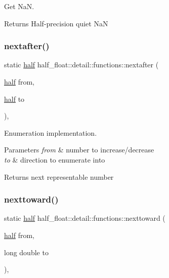 Get NaN. \begin{DoxyReturn}{Returns}
Half-\/precision quiet NaN 
\end{DoxyReturn}
\mbox{\label{structhalf__float_1_1detail_1_1functions_afad03c7ead9b0e39825852f274c72c5c}} 
\subsubsection{\texorpdfstring{nextafter()}{nextafter()}}
{\footnotesize\ttfamily static \hyperlink{classhalf__float_1_1half}{half} half\+\_\+float\+::detail\+::functions\+::nextafter (\begin{DoxyParamCaption}\item[{\hyperlink{classhalf__float_1_1half}{half}}]{from,  }\item[{\hyperlink{classhalf__float_1_1half}{half}}]{to }\end{DoxyParamCaption})\hspace{0.3cm}{\ttfamily [inline]}, {\ttfamily [static]}}

Enumeration implementation. 
\begin{DoxyParams}{Parameters}
{\em from} & number to increase/decrease \\
\hline
{\em to} & direction to enumerate into \\
\hline
\end{DoxyParams}
\begin{DoxyReturn}{Returns}
next representable number 
\end{DoxyReturn}
\mbox{\label{structhalf__float_1_1detail_1_1functions_a5d2061cb44af36a55953d764442236de}} 
\subsubsection{\texorpdfstring{nexttoward()}{nexttoward()}}
{\footnotesize\ttfamily static \hyperlink{classhalf__float_1_1half}{half} half\+\_\+float\+::detail\+::functions\+::nexttoward (\begin{DoxyParamCaption}\item[{\hyperlink{classhalf__float_1_1half}{half}}]{from,  }\item[{long double}]{to }\end{DoxyParamCaption})\hspace{0.3cm}{\ttfamily [inline]}, {\ttfamily [static]}}

